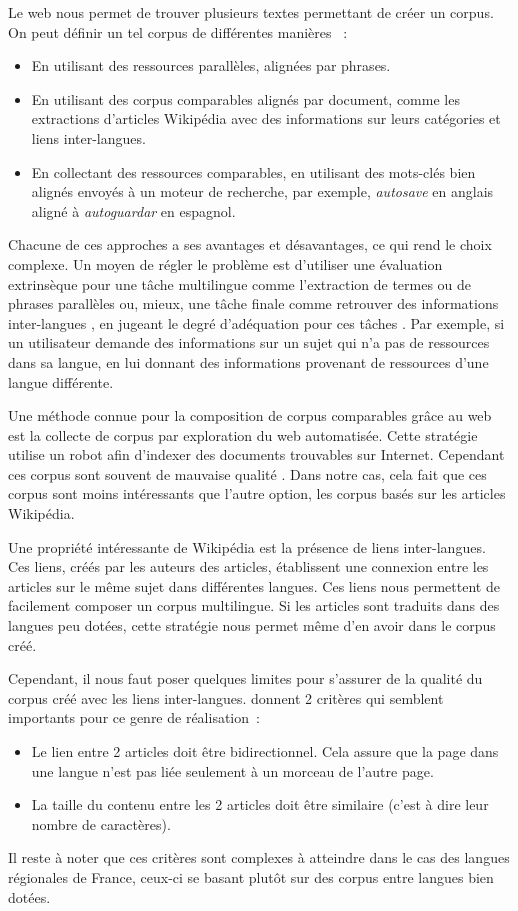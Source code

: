 Le web nous permet de trouver plusieurs textes permettant de créer un corpus.
On peut définir un tel corpus de différentes manières \citep{baroni_2004, sharoff_2013a}~:
\begin{itemize}
\item En utilisant des ressources parallèles, alignées par phrases.
\item En utilisant des corpus comparables alignés par document, comme les extractions d'articles Wikipédia
avec des informations sur leurs catégories et liens inter-langues.
\item En collectant des ressources comparables, en utilisant des mots-clés bien alignés envoyés à un moteur de
recherche, par exemple, \textit{autosave} en anglais aligné à \textit{autoguardar} en espagnol.
\end{itemize}

Chacune de ces approches a ses avantages et désavantages, ce qui rend le choix complexe.
Un moyen de régler le problème est d'utiliser une évaluation extrinsèque pour une tâche multilingue comme
l'extraction de termes ou de phrases parallèles \citep{bel_2013} ou, mieux,
une tâche finale comme retrouver des informations inter-langues \citep{li_2012}, en jugeant le degré
d'adéquation pour ces tâches \citep{sharoff_2013a}.
Par exemple, si un utilisateur demande des informations sur un sujet qui n'a pas de ressources
dans sa langue, en lui donnant des informations provenant de ressources d'une langue différente.

Une méthode connue pour la composition de corpus comparables grâce au web est la collecte de corpus par
exploration du web automatisée. Cette stratégie utilise un robot afin d'indexer des documents trouvables
sur Internet. Cependant ces corpus sont souvent de mauvaise qualité \citep{kreutzer_2022, kevers_2021, stosic_2024}.
Dans notre cas, cela fait que ces corpus sont moins intéressants que l'autre option, les corpus basés
sur les articles Wikipédia.

Une propriété intéressante de Wikipédia est la présence de liens inter-langues. Ces liens, créés par les auteurs des
articles, établissent une connexion entre les articles sur le même sujet dans différentes langues. Ces liens
nous permettent de facilement composer un corpus multilingue. Si les articles sont traduits dans des langues
peu dotées, cette stratégie nous permet même d'en avoir dans le corpus créé.

Cependant, il nous faut poser quelques limites pour s'assurer de la qualité du corpus créé avec
les liens inter-langues. \citet{sharoff_2016} donnent 2 critères qui semblent importants pour ce genre
de réalisation~:
\begin{itemize}
\item Le lien entre 2 articles doit être bidirectionnel. Cela assure que la page dans une langue n'est pas
liée seulement à un morceau de l'autre page.
\item La taille du contenu entre les 2 articles doit être similaire (c'est à dire leur nombre de caractères).
\end{itemize}
Il reste à noter que ces critères sont complexes à atteindre dans le cas des langues régionales de France,
ceux-ci se basant plutôt sur des corpus entre langues bien dotées.

